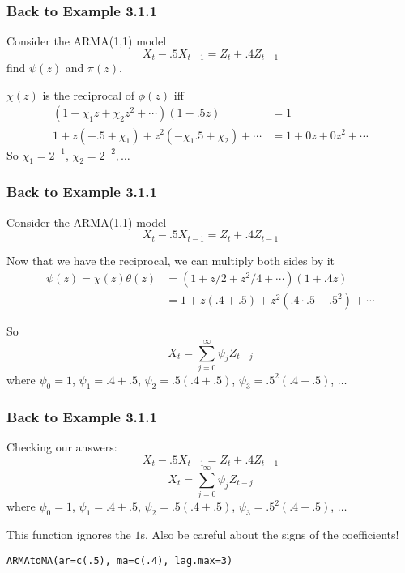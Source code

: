 \documentclass{beamer}
\begin{document}

\begin{frame}
\frametitle{Back to Example 3.1.1}
Consider the ARMA(1,1) model 
\[
X_t - .5 X_{t-1} = Z_t + .4 Z_{t-1}
\]
find $\psi(z)$ and $\pi(z)$.
\pause
\newline

$\chi(z)$ is the reciprocal of $\phi(z)$ iff
\begin{align*}
(1 + \chi_1 z + \chi_2 z^2 + \cdots)(1 - .5z) &= 1\\
1 + z(-.5 + \chi_1) + z^2(- \chi_1 .5 + \chi_2) + \cdots &= 1 + 0z + 0 z^2 + \cdots
\end{align*}
So $\chi_1 = 2^{-1}$, $\chi_2 = 2^{-2}, \ldots$
\end{frame}


\begin{frame}
\frametitle{Back to Example 3.1.1}
Consider the ARMA(1,1) model 
\[
X_t - .5 X_{t-1} = Z_t + .4 Z_{t-1}
\]

Now that we have the reciprocal, we can multiply both sides by it
\begin{align*}
\psi(z) = \chi(z)\theta(z) &= (1 + z/2 + z^2/4 + \cdots)(1 + .4z) \\
&= 1 + z(.4 + .5) + z^2(.4\cdot.5+.5^2) + \cdots
\end{align*}

So 
\[
X_t = \sum_{j=0}^{\infty}\psi_j Z_{t-j} 
\]
where $\psi_0 = 1$, $\psi_1 = .4 + .5$, $\psi_2 = .5(.4 + .5)$, $\psi_3 = .5^2(.4 + .5)$, $\ldots$
\newline

\end{frame}


\begin{frame}[fragile]
\frametitle{Back to Example 3.1.1}

Checking our answers:
\[
X_t - .5 X_{t-1} = Z_t + .4 Z_{t-1}
\]
\[
X_t = \sum_{j=0}^{\infty}\psi_j Z_{t-j} 
\]
where $\psi_0 = 1$, $\psi_1 = .4 + .5$, $\psi_2 = .5(.4 + .5)$, $\psi_3 = .5^2(.4 + .5)$, $\ldots$
\newline

This function ignores the $1$s. Also be careful about the signs of the coefficients!
\begin{verbatim}
ARMAtoMA(ar=c(.5), ma=c(.4), lag.max=3)
\end{verbatim}

\end{frame}
\end{document}
